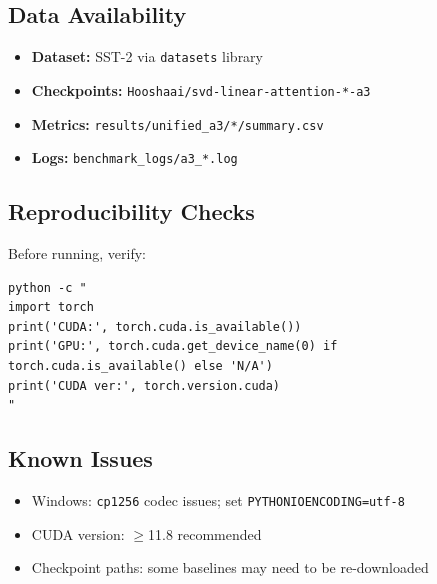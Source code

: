 \subsection{Data Availability}

\begin{itemize}
\item \textbf{Dataset:} SST-2 via \texttt{datasets} library
\item \textbf{Checkpoints:} \texttt{Hooshaai/svd-linear-attention-*-a3}
\item \textbf{Metrics:} \texttt{results/unified\_a3/*/summary.csv}
\item \textbf{Logs:} \texttt{benchmark\_logs/a3\_*.log}

\end{itemize}
\subsection{Reproducibility Checks}

Before running, verify:

\begin{lstlisting}
python -c "
import torch
print('CUDA:', torch.cuda.is_available())
print('GPU:', torch.cuda.get_device_name(0) if torch.cuda.is_available() else 'N/A')
print('CUDA ver:', torch.version.cuda)
"
\end{lstlisting}

\subsection{Known Issues}

\begin{itemize}
\item Windows: \texttt{cp1256} codec issues; set \texttt{PYTHONIOENCODING=utf-8}
\item CUDA version: $\ge$11.8 recommended
\item Checkpoint paths: some baselines may need to be re-downloaded
\end{itemize}